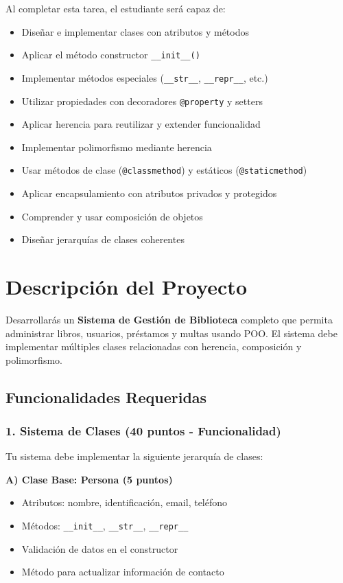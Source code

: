 \documentclass[11pt,letterpaper]{article}
\begin{document}
Al completar esta tarea, el estudiante será capaz de:

\begin{itemize}
    \item Diseñar e implementar clases con atributos y métodos
    \item Aplicar el método constructor \texttt{\_\_init\_\_()}
    \item Implementar métodos especiales (\texttt{\_\_str\_\_}, \texttt{\_\_repr\_\_}, etc.)
    \item Utilizar propiedades con decoradores \texttt{@property} y setters
    \item Aplicar herencia para reutilizar y extender funcionalidad
    \item Implementar polimorfismo mediante herencia
    \item Usar métodos de clase (\texttt{@classmethod}) y estáticos (\texttt{@staticmethod})
    \item Aplicar encapsulamiento con atributos privados y protegidos
    \item Comprender y usar composición de objetos
    \item Diseñar jerarquías de clases coherentes
\end{itemize}

\section{Descripción del Proyecto}

Desarrollarás un \textbf{Sistema de Gestión de Biblioteca} completo que permita administrar libros, usuarios, préstamos y multas usando POO. El sistema debe implementar múltiples clases relacionadas con herencia, composición y polimorfismo.

\subsection{Funcionalidades Requeridas}

\subsubsection{1. Sistema de Clases (40 puntos - Funcionalidad)}

Tu sistema debe implementar la siguiente jerarquía de clases:

\textbf{A) Clase Base: Persona (5 puntos)}
\begin{itemize}
    \item Atributos: nombre, identificación, email, teléfono
    \item Métodos: \texttt{\_\_init\_\_}, \texttt{\_\_str\_\_}, \texttt{\_\_repr\_\_}
    \item Validación de datos en el constructor
    \item Método para actualizar información de contacto
\end{itemize}
\end{document}
